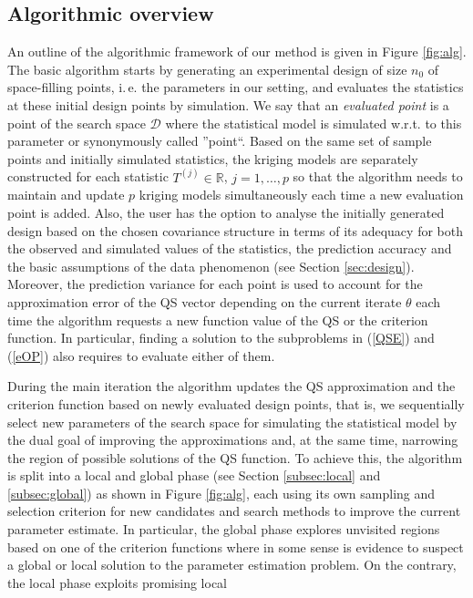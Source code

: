 \documentclass[article, nojss]{jss}
\numberwithin{equation}{section}			%
\newcommand{\R}{\mathbb{R}}
\newcommand{\D}{\mathcal{D}}
\begin{document}
\subsection{Algorithmic overview}
%
An outline of the algorithmic framework of our method is given in Figure
\ref{fig:alg}. The basic algorithm starts by generating an experimental design
of size $n_0$ of space-filling points, i.\,e. the parameters in our setting, and
evaluates the statistics at these initial design points by simulation. We say
that an \emph{evaluated point} is a point of the search space $\D$ where the statistical model
is simulated w.r.t. to this parameter or synonymously called ''point``. Based on
the same set of sample points and initially simulated statistics, the kriging models are separately
constructed for each statistic $T^{(j)}\in\R$, $j=1,\ldots,p$ so that
the algorithm needs to maintain and update $p$ kriging models simultaneously
each time a new evaluation point is added. Also, the user has the option to
analyse the initially generated design based on the chosen covariance structure in terms of its adequacy
for both the observed and simulated values of the statistics, the prediction
accuracy and the basic assumptions of the data phenomenon (see Section \ref{sec:design}).
Moreover, the prediction variance for each point is used to account for the
approximation error of the QS vector depending on the current iterate $\theta$ each time the algorithm
requests a new function value of the QS or the criterion function. In particular, finding a solution to
the subproblems in (\ref{QSE}) and (\ref{eOP}) also requires to evaluate either
of them.\par
%
During the main iteration the algorithm updates the QS approximation and the
criterion function based on newly evaluated design points, that is, we
sequentially select new parameters of the search space for simulating the statistical model
by the dual goal of improving the approximations and, at the same time,
narrowing the region of possible solutions of the QS function. To achieve this, the algorithm
is split into a local and global phase (see Section \ref{subsec:local} and \ref{subsec:global})
as shown in Figure \ref{fig:alg}, each using its own sampling and selection
criterion for new candidates and search methods to improve the current parameter estimate.
In particular, the global phase explores unvisited regions based on one of the
criterion functions where in some sense is evidence to suspect a global or local solution to the parameter
estimation problem. On the contrary, the local phase exploits promising local
\end{document}

